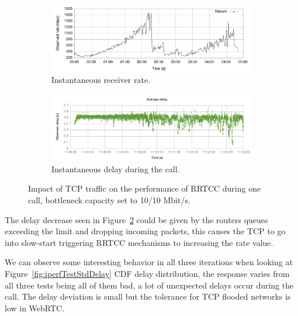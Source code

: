 \begin{figure}[h]
        \centering
        \begin{subfigure}[h]{1\textwidth}
                \centering
                \includegraphics[width=\textwidth]{./figures/iperf_rate.pdf}
      \caption[Instantaneous receiver rate]{Instantaneous receiver rate.}
	\label{fig:iperf_rate}
        \end{subfigure}
        
        \begin{subfigure}[h]{1\textwidth}
                \centering
                \includegraphics[width=\textwidth]{./figures/iperf_delay.pdf}
      \caption[Instantaneous delay during the call]{Instantaneous delay during the call.}
	\label{fig:iperf_delay}
        \end{subfigure}
        \caption[Impact of TCP traffic on the performance of RRTCC during one call, bottleneck capacity set to 10/10 Mbit/s]{Impact of TCP traffic on the performance of RRTCC during one call, bottleneck capacity set to 10/10 Mbit/s.}
        \label{fig:iperf_plots}
\end{figure}

The delay decrease seen in Figure~\ref{fig:iperf_delay} could be given by the routers queues exceeding the limit and dropping incoming packets, this causes the TCP to go into slow-start triggering RRTCC mechanisms to increasing the rate value.

We can observe some interesting behavior in all three iterations when looking at Figure~\ref{fig:iperfTestStdDelay} CDF delay distribution, the response varies from all three tests being all of them bad, a lot of unexpected delays occur during the call. The delay deviation is small but the tolerance for TCP flooded networks is low in WebRTC.

